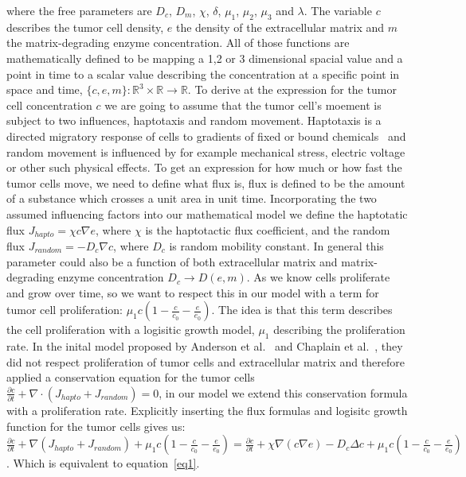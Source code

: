 where the free parameters are $D_c$, $D_m$, $\chi$, $\delta$, $\mu_1$, $\mu_2$, $\mu_3$ and $\lambda$. \newline
The variable $c$ describes the tumor cell density, $e$ the density of the extracellular matrix and $m$ the matrix-degrading enzyme concentration. All of those functions are mathematically defined to be mapping a 1,2 or 3 dimensional spacial value and a point in time to a scalar value describing the concentration at a specific point in space and time, $\{c,e,m\} : \mathbb{R}^{3} \times \mathbb{R} \rightarrow \mathbb{R}$.\newline
To derive at the expression for the tumor cell concentration $c$ we are going to assume that the tumor cell's moement is subject to two influences, haptotaxis and random movement. Haptotaxis is a directed migratory response of cells to gradients of fixed or bound chemicals~\cite{anderson_continuous_1998} and random movement is influenced by for example mechanical stress, electric voltage or other such physical effects. To get an expression for how much or how fast the tumor cells move, we need to define what flux is, flux is defined to be the amount of a substance  which crosses a unit area in unit time. Incorporating the two assumed influencing factors into our mathematical model we define the haptotatic flux $J_{hapto} = \chi c \nabla e$, where $\chi$ is the haptotactic flux coefficient, and the random flux $J_{random} = -D_c \nabla c$, where $D_c$ is random mobility constant. In general this parameter could also be a function of both extracellular matrix and matrix-degrading enzyme concentration $D_c \rightarrow D(e,m)$. As we know cells proliferate and grow over time, so we want to respect this in our model with a term for tumor cell proliferation: $\mu_1 c (1-\frac{c}{c_0} - \frac{e}{e_0})$. The idea is that this term describes the cell proliferation with a logisitic growth model, $\mu_1$ describing the proliferation rate. In the inital model proposed by Anderson et al.~\cite{anderson_continuous_1998, anderson_mathematical_2000} and Chaplain et al.~\cite{anderson_continuous_1998,chaplain_mathematical_2006,chaplain_mathematical_2006-1,franssen_mathematical_2019}, they did not respect proliferation of tumor cells and extracellular matrix and therefore applied a conservation equation for the tumor cells $\frac{\partial c}{\partial t} + \nabla \cdot (J_{hapto} + J_{random}) = 0$, in our model we extend this conservation formula with a proliferation rate. Explicitly inserting the flux formulas and logisitc growth function for the tumor cells gives us: $\frac{\partial c}{\partial t} + \nabla (J_{hapto} + J_{random}) + \mu_1 c (1-\frac{c}{c_0} - \frac{e}{e_0}) = \frac{\partial c}{\partial t} + \chi \nabla (c \nabla e) - D_c \Delta c + \mu_1 c (1-\frac{c}{c_0} - \frac{e}{e_0})$. Which is equivalent to equation~\ref{eq1}.\newline
